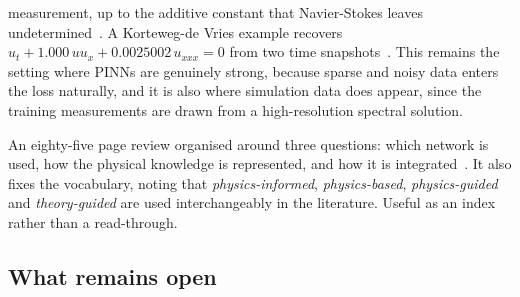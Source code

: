 \documentclass[11pt, a4paper]{article}
\begin{document}
\begin{description}[style=nextline]
  measurement, up to the additive constant that Navier-Stokes leaves
  undetermined~\citep[fig.~3]{raissi2}. A Korteweg-de Vries example recovers
  $u_t + 1.000\,u u_x + 0.0025002\,u_{xxx} = 0$ from two time
  snapshots~\citep[fig.~5]{raissi2}.
  This remains the setting where PINNs are genuinely strong, because sparse
  and noisy data enters the loss naturally, and it is also where simulation
  data does appear, since the training measurements are drawn from a
  high-resolution spectral solution.
  \item[Cuomo et al., survey~\citep{cuomo}]
  An eighty-five page review organised around three questions: which network
  is used, how the physical knowledge is represented, and how it is
  integrated~\citep[\S{}1.1]{cuomo}. It also fixes the vocabulary, noting that
  \emph{physics-informed}, \emph{physics-based}, \emph{physics-guided} and
  \emph{theory-guided} are used interchangeably in the literature. Useful as
  an index rather than a read-through.
\end{description}

\subsection{What remains open}
\end{document}
